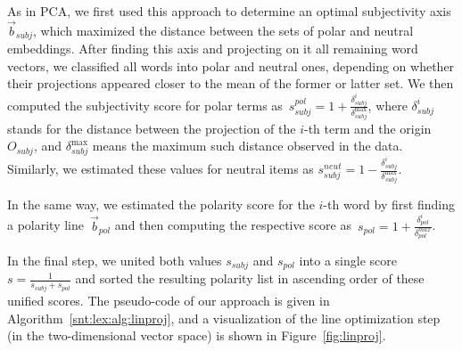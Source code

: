 
As in PCA, we first used this approach to determine an optimal
subjectivity axis $\vec{b}_{subj}$, which maximized the distance
between the sets of polar and neutral embeddings.  After finding this
axis and projecting on it all remaining word vectors, we classified
all words into polar and neutral ones, depending on whether their
projections appeared closer to the mean of the former or latter set.
We then computed the subjectivity score for polar terms
as~$s^{pol}_{subj} = 1 +
\frac{\delta_{subj}^i}{\delta_{subj}^{\max}}$, where $\delta_{subj}^i$
stands for the distance between the projection of the $i$-th term and
the origin $O_{subj}$, and $\delta_{subj}^{\max}$ means the maximum
such distance observed in the data. Similarly, we estimated these
values for neutral items as $s^{neut}_{subj} = 1 -
\frac{\delta_{subj}^i}{\delta_{subj}^{\max}}$.

In the same way, we estimated the polarity score for the $i$-th word
by first finding a polarity line~$\vec{b}_{pol}$ and then computing
the respective score as~$s_{pol} = 1 +
\frac{\delta^i_{pol}}{{\delta}^{max}_{pol}}$.

In the final step, we united both values $s_{subj}$ and $s_{pol}$ into
a single score $s = \frac{1}{s_{subj} + s_{pol}}$ and sorted the
resulting polarity list in ascending order of these unified scores.
The pseudo-code of our approach is given in
Algorithm~\ref{snt:lex:alg:linproj}, and a visualization of the line
optimization step (in the two-dimensional vector space) is shown in
Figure~\ref{fig:linproj}.

